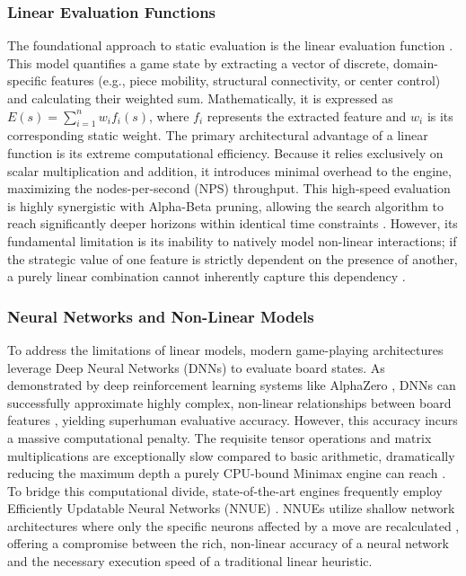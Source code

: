\subsubsection{Linear Evaluation Functions}The foundational approach to static evaluation is the linear evaluation function \cite{shannon1950programming}. This model quantifies a game state by extracting a vector of discrete, domain-specific features (e.g., piece mobility, structural connectivity, or center control) and calculating their weighted sum. Mathematically, it is expressed as $E(s) = \sum_{i=1}^{n} w_i f_i(s)$, where $f_i$ represents the extracted feature and $w_i$ is its corresponding static weight. The primary architectural advantage of a linear function is its extreme computational efficiency. Because it relies exclusively on scalar multiplication and addition, it introduces minimal overhead to the engine, maximizing the nodes-per-second (NPS) throughput. This high-speed evaluation is highly synergistic with Alpha-Beta pruning, allowing the search algorithm to reach significantly deeper horizons within identical time constraints \cite{schaeffer1996new, brange2021evaluating}. However, its fundamental limitation is its inability to natively model non-linear interactions; if the strategic value of one feature is strictly dependent on the presence of another, a purely linear combination cannot inherently capture this dependency \cite{silver2018general, nasu2018nnue}.

\subsubsection{Neural Networks and Non-Linear Models}

To address the limitations of linear models, modern game-playing architectures leverage Deep Neural Networks (DNNs) to evaluate board states. As demonstrated by deep reinforcement learning systems like AlphaZero \cite{silver2018general}, DNNs can successfully approximate highly complex, non-linear relationships between board features \cite{hornik1989multilayer}, yielding superhuman evaluative accuracy. However, this accuracy incurs a massive computational penalty. The requisite tensor operations and matrix multiplications are exceptionally slow compared to basic arithmetic, dramatically reducing the maximum depth a purely CPU-bound Minimax engine can reach \cite{silver2018general}. To bridge this computational divide, state-of-the-art engines frequently employ Efficiently Updatable Neural Networks (NNUE) \cite{nasu2018nnue}. NNUEs utilize shallow network architectures where only the specific neurons affected by a move are recalculated \cite{nasu2018nnue}, offering a compromise between the rich, non-linear accuracy of a neural network and the necessary execution speed of a traditional linear heuristic.

